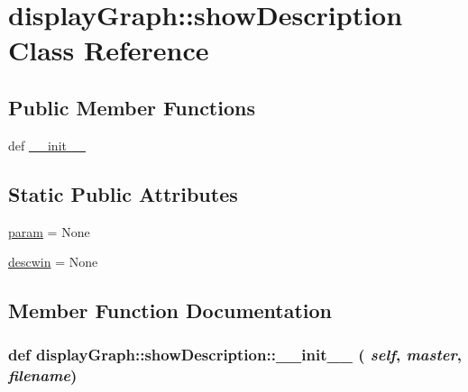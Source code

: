 \hypertarget{classdisplayGraph_1_1showDescription}{
\section{displayGraph::showDescription Class Reference}
\label{classdisplayGraph_1_1showDescription}
}
\subsection*{Public Member Functions}
\begin{CompactItemize}
\item 
def \hyperlink{classdisplayGraph_1_1showDescription_f6973e417eeea54a7045e7f9cc5ecd8f}{\_\-\_\-init\_\-\_\-}
\end{CompactItemize}
\subsection*{Static Public Attributes}
\begin{CompactItemize}
\item 
\hyperlink{classdisplayGraph_1_1showDescription_d395b33a95e9cbe35418aa298270f560}{param} = None
\item 
\hyperlink{classdisplayGraph_1_1showDescription_5c9ecb9b79318f02a26eea3377b9a0ef}{descwin} = None
\end{CompactItemize}


\subsection{Member Function Documentation}
\hypertarget{classdisplayGraph_1_1showDescription_f6973e417eeea54a7045e7f9cc5ecd8f}{
\subsubsection{\setlength{\rightskip}{0pt plus 5cm}def displayGraph::showDescription::\_\-\_\-init\_\-\_\- ( {\em self}, \/   {\em master}, \/   {\em filename})}}
\label{classdisplayGraph_1_1showDescription_f6973e417eeea54a7045e7f9cc5ecd8f}




